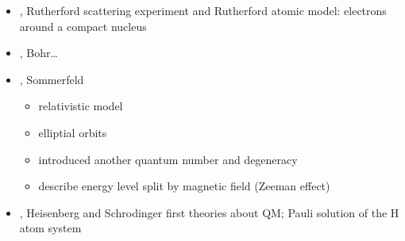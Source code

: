 \documentclass[letterpaper,10pt,english]{jupyterBook}
\begin{document}
\begin{itemize}
\item {} 
, Rutherford scattering experiment and Rutherford atomic model: electrons around a compact nucleus

\item {} 
, Bohr…

\item {} 
, Sommerfeld
\begin{itemize}
\item {} 
\sphinxAtStartPar
relativistic model

\item {} 
\sphinxAtStartPar
elliptial orbits

\item {} 
\sphinxAtStartPar
introduced another quantum number and degeneracy

\item {} 
\sphinxAtStartPar
describe energy level split by magnetic field (Zeeman effect)

\end{itemize}

\item {} 
, Heisenberg and Schrodinger first theories about QM; Pauli solution of the \(\text{H}\) atom system

\end{itemize}
\end{document}

